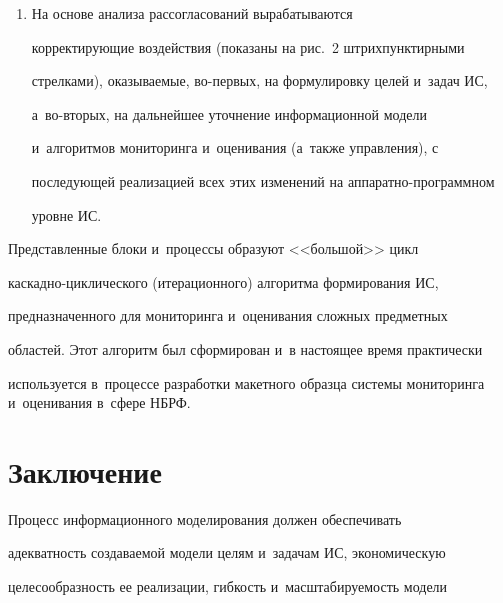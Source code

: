 \begin{enumerate}[1.]
рассогласования по представленным выше факторам и~оценивание степени 


влияния каждого из них в~настоящее время представляется трудно 


формализуемым, в~связи с~чем его основным инструментом представляется 


метод экспертного оценивания.


     \item На основе анализа рассогласований вырабатываются 


корректирующие воздействия (показаны на рис.~2 штрих\-пунк\-тир\-ны\-ми 


стрелками), оказываемые, во-первых, на формулировку целей и~задач ИС, 


а~во-вто\-рых, на дальнейшее уточнение информационной модели 


и~алгоритмов мониторинга и~оценивания (а~также управления), с~


последующей реализацией всех этих изменений на ап\-па\-рат\-но-про\-граммном 


уровне ИС.


     \end{enumerate}


     


     Представленные блоки и~процессы образуют <<большой>> цикл 


каскадно-цик\-ли\-че\-ско\-го (итерационного) алгоритма формирования ИС, 


предназначенного для мониторинга и~оценивания сложных предметных 


областей. Этот алгоритм был сформирован и~в настоящее время практически 


используется в~процессе разработки макетного образца системы мониторинга и~оценивания в~сфере НБРФ.





\section{Заключение }





    Процесс информационного моделирования должен обеспечивать 


адекватность создаваемой модели целям и~задачам ИС, экономическую 


целесообразность ее реализации, гибкость и~масштабируемость модели 


